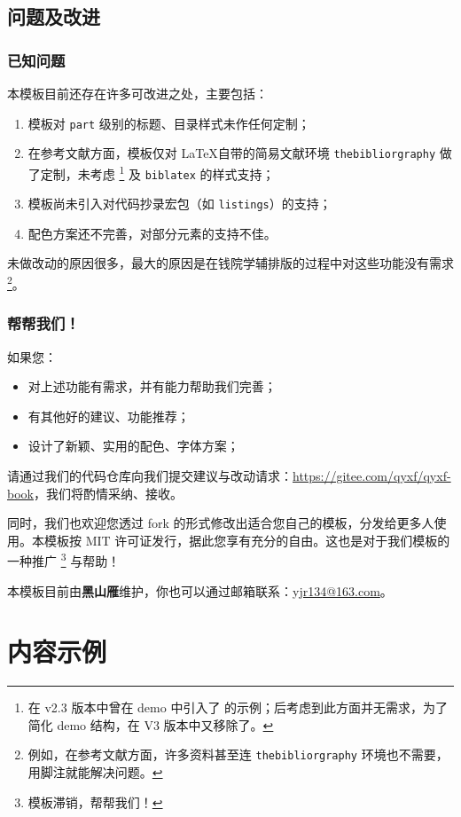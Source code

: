 \documentclass[
    10pt,
    oneside,
    openany,
    b5paper,
    colorscheme = black  %
]{qyxf-book}
\begin{document}
\section{问题及改进}

\subsection{已知问题}

本模板目前还存在许多可改进之处，主要包括：
\begin{enumerate}
    \item 模板对 \verb|part| 级别的标题、目录样式未作任何定制；
    \item 在参考文献方面，模板仅对 \LaTeX 自带的简易文献环境 \verb|thebibliorgraphy| 做了定制，未考虑 
    \footnote{在 v2.3 版本中曾在 demo 中引入了  的示例；后考虑到此方面并无需求，为了简化 demo 结构，在 V3 版本中又移除了。}
    及 \verb|biblatex| 的样式支持；
    \item 模板尚未引入对代码抄录宏包（如 \verb|listings|）的支持；
    \item 配色方案还不完善，对部分元素的支持不佳。
\end{enumerate}
未做改动的原因很多，最大的原因是在钱院学辅排版的过程中对这些功能没有需求
\footnote{例如，在参考文献方面，许多资料甚至连 \texttt{thebibliorgraphy} 环境也不需要，用脚注就能解决问题。}。

\subsection{帮帮我们！}

如果您：
\begin{itemize}
    \item 对上述功能有需求，并有能力帮助我们完善；
    \item 有其他好的建议、功能推荐；
    \item 设计了新颖、实用的配色、字体方案；
\end{itemize}
请通过我们的代码仓库向我们提交建议与改动请求：\url{https://gitee.com/qyxf/qyxf-book}，我们将酌情采纳、接收。

同时，我们也欢迎您透过 fork 的形式修改出适合您自己的模板，分发给更多人使用。本模板按 MIT 许可证发行，据此您享有充分的自由。这也是对于我们模板的一种推广
\footnote{模板滞销，帮帮我们！}
与帮助！

本模板目前由\textbf{黑山雁}维护，你也可以通过邮箱联系：\url{yjr134@163.com}。

\chapter{内容示例}
\end{document}
